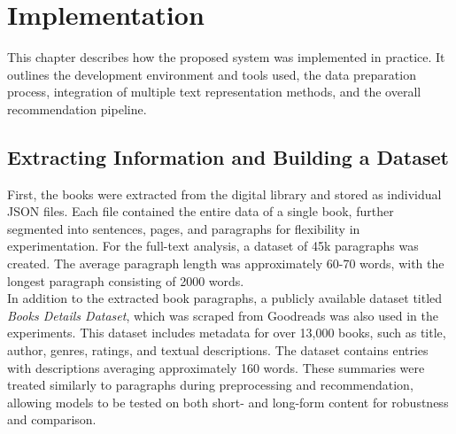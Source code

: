 \documentclass[\myFontSize,oneside,english,hidelinks,a4paper]{article}
\begin{document}
%
%
%
%
%






\clearpage{}
\section{Implementation}
This chapter describes how the proposed system was implemented in practice. It outlines the development environment and tools used, the data preparation process, integration of multiple text representation methods, and the overall recommendation pipeline. 

\subsection{Extracting Information and Building a Dataset}
First, the books were extracted from the digital library and stored as individual JSON files. Each file contained the entire data of a single book, further segmented into sentences, pages, and paragraphs for flexibility in experimentation.
For the full-text analysis, a dataset of 45k paragraphs was created. The average paragraph length was approximately 60-70 words, with the longest paragraph consisting of 2000 words.\\
In addition to the extracted book paragraphs, a publicly available dataset titled \textit{Books Details Dataset}, which was scraped from Goodreads \cite{goodreads_kumar_2022} was also used in the experiments. This dataset includes metadata for over 13,000 books, such as title, author, genres, ratings, and textual descriptions. The dataset contains entries with descriptions averaging approximately 160 words. These summaries were treated similarly to paragraphs during preprocessing and recommendation, allowing models to be tested on both short- and long-form content for robustness and comparison.\\
\end{document}
